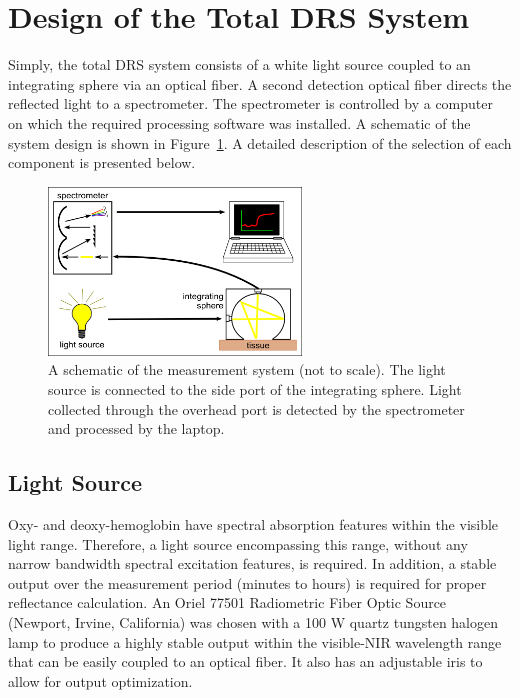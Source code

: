 \section{Design of the Total DRS System}
Simply, the total DRS system consists of a white light source coupled to an integrating sphere via an optical fiber. A second detection optical fiber directs the reflected light to a spectrometer. The spectrometer is controlled by a computer on which the required processing software was installed. A schematic of the system design is shown in Figure~\ref{fig:p1-sys_diagram}. A detailed description of the selection of each component is presented below.

\begin{figure}
	\centering \includegraphics[width=0.6\textwidth]{figures/p1-sys_diagram.png}
	\caption[System schematic]{\label{fig:p1-sys_diagram}A schematic of the measurement system (not to scale). The light source is connected to the side port of the integrating sphere. Light collected through the overhead port is detected by the spectrometer and processed by the laptop.}
\end{figure}

\subsection{Light Source}
Oxy- and deoxy-hemoglobin have spectral absorption features within the visible light range.\cite{Young1997,Lister2012} Therefore, a light source encompassing this range, without any narrow bandwidth spectral excitation features, is required. In addition, a stable output over the measurement period (minutes to hours) is required for proper reflectance calculation. An Oriel 77501 Radiometric Fiber Optic Source (Newport, Irvine, California) was chosen with a 100 W quartz tungsten halogen lamp to produce a highly stable output within the visible-NIR wavelength range that can be easily coupled to an optical fiber. It also has an adjustable iris to allow for output optimization.

